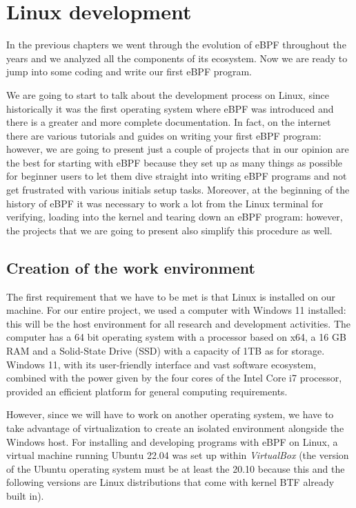 \chapter{Linux development}

In the previous chapters we went through the evolution of eBPF throughout the years and we analyzed all the components of its ecosystem.
Now we are ready to jump into some coding and write our first eBPF program.

We are going to start to talk about the development process on Linux, since historically it was the first operating system where eBPF was introduced and there is a greater and more complete documentation.
In fact, on the internet there are various tutorials and guides on writing your first eBPF program: however, we are going to present just a couple of projects that in our opinion are the best for starting with eBPF because they set up as many things as possible for beginner users to let them dive straight into writing eBPF programs and not get frustrated with various initials setup tasks.
Moreover, at the beginning of the history of eBPF it was necessary to work a lot from the Linux terminal for verifying, loading into the kernel and tearing down an eBPF program: however, the projects that we are going to present also simplify this procedure as well.

\section{Creation of the work environment}

The first requirement that we have to be met is that Linux is installed on our machine.
For our entire project, we used a computer with Windows 11 installed: this will be the host environment for all research and development activities. 
The computer has a 64 bit operating system with a processor based on x64, a 16 GB RAM and a Solid-State Drive (SSD) with a capacity of 1TB as for storage.
Windows 11, with its user-friendly interface and vast software ecosystem, combined with the power given by the four cores of the Intel Core i7 processor, provided an efficient platform for general computing requirements.

However, since we will have to work on another operating system, we have to take advantage of virtualization to create an isolated environment alongside the Windows host.
For installing and developing programs with eBPF on Linux, a virtual machine running Ubuntu 22.04 was set up within \textit{VirtualBox} (the version of the Ubuntu operating system must be at least the 20.10 because this and the following versions are Linux distributions that come with kernel BTF already built in).

